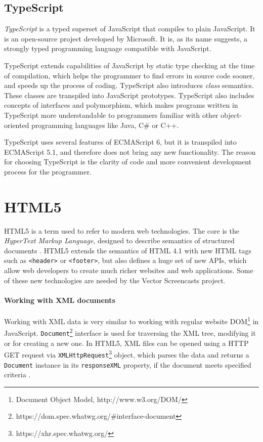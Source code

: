 \subsection{TypeScript}
\textit{TypeScript} is a typed superset of JavaScript that compiles to plain JavaScript\cite{typescript}. It is an open-source project developed by Microsoft. It is, as its name suggests, a strongly typed programming language compatible with JavaScript.

TypeScript extends capabilities of JavaScript by static type checking at the time of compilation, which helps the programmer to find errors in source code sooner, and speeds up the process of coding. TypeScript also introduces \textit{class} semantics. These classes are transpiled into JavaScript prototypes. TypeScript also includes concepts of interfaces and polymorphism, which makes programs written in TypeScript more understandable to programmers familiar with other object-oriented programming languages like Java, C\# or C++.

TypeScript uses several features of ECMAScript 6, but it is transpiled into ECMAScript 5.1, and therefore does not bring any new functionality. The reason for choosing TypeScript is the clarity of code and more convenient development process for the programmer.








\section{HTML5}

HTML5 is a term used to refer to modern web technologies. The core is the \textit{HyperText Markup Language}, designed to describe semantics of structured documents \cite{html5}. HTML5 extends the semantics of HTML 4.1 with new HTML tags such as \verb|<header>| or \verb|<footer>|, but also defines a huge set of new APIs, which allow web developers to create much richer websites and web applications. Some of these new technologies are needed by the Vector Screencasts project.

\paragraph{Working with XML documents}
Working with XML data is very similar to working with regular website DOM\footnote{Document Object Model, http://www.w3.org/DOM/} in JavaScript. \verb|Document|\footnote{https://dom.spec.whatwg.org/\#interface-document} interface is used for traversing the XML tree, modifying it or for creating a new one. In HTML5, XML files can be opened using a HTTP GET request via \verb|XMLHttpRequest|\footnote{https://xhr.spec.whatwg.org/} object, which parses the data and returns a \verb|Document| instance in its \verb|responseXML| property, if the document meets specified criteria \cite{xhr}.

